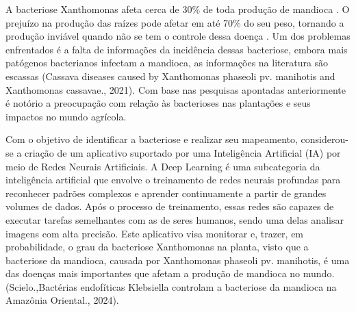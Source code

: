 A bacteriose Xanthomonas afeta cerca de 30\% de toda produção de mandioca \textcite{Germoplasma}. O prejuízo na produção das raízes pode afetar em até 70\% do seu peso, tornando a produção inviável quando não se tem o controle dessa doença \textcite{Embrapa}. Um dos problemas enfrentados é a falta de informações da incidência dessas bacteriose, embora mais patógenos bacterianos infectam a mandioca, as informações na literatura são escassas (Cassava diseases caused by Xanthomonas phaseoli pv. manihotis and Xanthomonas cassavae., 2021)\textcite{Cassava1999}. Com base nas pesquisas apontadas anteriormente é notório a preocupação com relação às bacterioses nas plantações e seus impactos no mundo agrícola. 

Com o objetivo de identificar a bacteriose e realizar seu mapeamento, considerou-se a criação de um aplicativo suportado por uma Inteligência Artificial (IA) por meio de Redes Neurais Artificiais. A Deep Learning é uma subcategoria da inteligência artificial que envolve o treinamento de redes neurais profundas para reconhecer padrões complexos e aprender continuamente a partir de grandes volumes de dados. Após o processo de treinamento, essas redes são capazes de executar tarefas semelhantes com as de seres humanos, sendo uma delas analisar imagens com alta precisão. Este aplicativo visa monitorar e, trazer, em probabilidade, o grau da bacteriose Xanthomonas na planta, visto que a bacteriose da mandioca, causada por Xanthomonas phaseoli pv. manihotis, é uma das doenças mais importantes que afetam a produção de mandioca no mundo.(Scielo.,Bactérias endofíticas Klebsiella controlam a bacteriose da mandioca na Amazônia Oriental., 2024)\cite{Klebsiella}.



